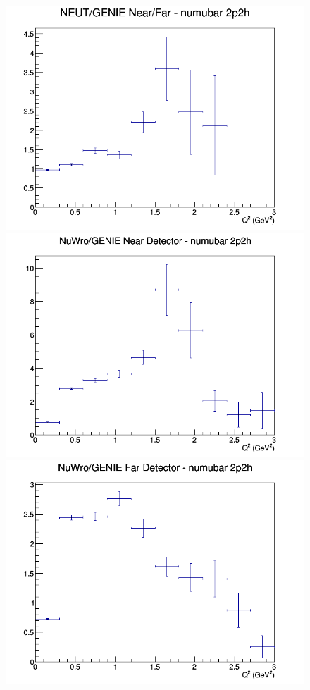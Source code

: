 \documentclass[12pt]{article}
\begin{document}
\begin{figure}[h]
\endminipage
{}
\includegraphics[width=\linewidth]{eff_Q2/FGT/ratios/2p2h_NEUT_GENIE_numubar_NF_Q2.png}
\endminipage
\newline
{}
\includegraphics[width=\linewidth]{eff_Q2/FGT/ratios/2p2h_NuWro_GENIE_numubar_near_Q2.png}
\endminipage
{}
\includegraphics[width=\linewidth]{eff_Q2/FGT/ratios/2p2h_NuWro_GENIE_numubar_far_Q2.png}

\end{figure}
\end{document}
